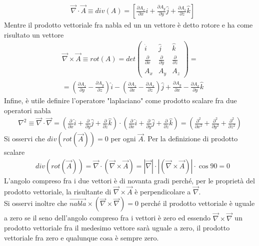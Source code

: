 \documentclass[10pt,a4paper]{article}
\begin{document}
\begin{align*}
&\vec{\nabla} \cdot \vec{A} \equiv div(A) = [\frac{\partial A_x}{\partial x} \hat{i}+\frac{\partial A_y}{\partial y} \hat{j}+\frac{\partial A_z}{\partial z} \hat{k}]
\end{align*}
Mentre il prodotto vettoriale fra nabla ed un un vettore è detto rotore e ha come risultato un vettore
\begin{align*}
&\vec{\nabla} \times \vec{A} \equiv rot(A) = det 
\begin{pmatrix}
\hat{i} & \hat{j} & \hat{k}\\
\frac{\partial}{\partial x} & \frac{\partial}{\partial y} & \frac{\partial}{\partial z}\\
A_x & A_y & A_z
\end{pmatrix} = \\
& = (\frac{\partial A_z}{\partial y}-\frac{\partial A_y}{\partial z})\hat{i}-(\frac{\partial A_z}{\partial x}-\frac{\partial A_x}{\partial z}) \hat{j} + \frac{\partial A_y}{\partial x}-\frac{\partial A_x}{\partial y} \hat{k}
\end{align*}
Infine, è utile definire l'operatore "laplaciano" come prodotto scalare fra due operatori nabla
\begin{align*}
\nabla^2 \equiv \vec{\nabla} \cdot \vec{\nabla} = (\frac{\partial }{\partial x} \hat{i}+\frac{\partial }{\partial y} \hat{j}+\frac{\partial }{\partial z} \hat{k} ) \cdot (\frac{\partial }{\partial x} \hat{i}+\frac{\partial }{\partial y} \hat{j}+\frac{\partial }{\partial z} \hat{k} ) = (\frac{\partial^2 }{\partial x^2} +\frac{\partial^2 }{\partial y^2} +\frac{\partial^2 }{\partial z^2} )
\end{align*}	
Si osservi che $div(rot(\vec{A}))=0$ per ogni $\vec{A}$. Per la definizione di prodotto scalare
\begin{align*}
&div(rot(\vec{A})) = \vec{\nabla} \cdot (\vec{\nabla} \times \vec{A}) = |\vec{\nabla}| \cdot |(\vec{\nabla} \times \vec{A})| \cdot \cos90 = 0 
\end{align*}
L'angolo compreso fra i due vettori è di novanta gradi perché, per le proprietà del prodotto vettoriale, la risultante di $\vec{\nabla} \times \vec{A}$ è perpendicolare a $\vec{\nabla}$.\\
Si osservi inoltre che $\vec{nabla} \times (\vec{\nabla} \times \vec{\nabla}) = 0$ perché il prodotto vettoriale è uguale a zero se il seno dell'angolo compreso fra i vettori è zero ed essendo $\vec{\nabla} \times \vec{\nabla}$ un prodotto vettoriale fra il medesimo vettore sarà uguale a zero, il prodotto vettoriale fra zero e qualunque cosa è sempre zero.
\end{document}
